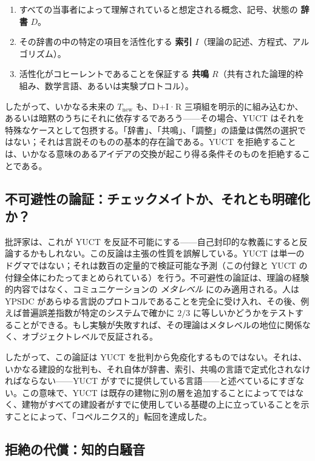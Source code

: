 \documentclass[12pt,a4paper]{article}
\begin{document}
	\begin{enumerate}
		\item すべての当事者によって理解されていると想定される概念、記号、状態の \textbf{辞書} \(D\)。
		\item その辞書の中の特定の項目を活性化する \textbf{索引} \(I\)（理論の記述、方程式、アルゴリズム）。
		\item 活性化がコヒーレントであることを保証する \textbf{共鳴} \(R\)（共有された論理的枠組み、数学言語、あるいは実験プロトコル）。
	\end{enumerate}
	
	したがって、いかなる未来の \(T_{\text{new}}\) も、D+I·R 三項組を明示的に組み込むか、あるいは暗黙のうちにそれに依存するであろう——その場合、YUCT はそれを特殊なケースとして包摂する。「辞書」、「共鳴」、「調整」の語彙は偶然の選択ではない；それは言説そのものの基本的存在論である。YUCT を拒絶することは、いかなる意味のあるアイデアの交換が起こり得る条件そのものを拒絶することである。
	
	\subsection{不可避性の論証：チェックメイトか、それとも明確化か？}
	
	批評家は、これが YUCT を反証不可能にする——自己封印的な教義にすると反論するかもしれない。この反論は主張の性質を誤解している。YUCT は単一のドグマではない；それは数百の定量的で検証可能な予測（この付録と YUCT の付録全体にわたってまとめられている）を行う。不可避性の論証は、理論の経験的内容ではなく、コミュニケーションの \emph{メタレベル} にのみ適用される。人は YPSDC があらゆる言説のプロトコルであることを完全に受け入れ、その後、例えば普遍誤差指数が特定のシステムで確かに \(2/3\) に等しいかどうかをテストすることができる。もし実験が失敗すれば、その理論はメタレベルの地位に関係なく、オブジェクトレベルで反証される。
	
	したがって、この論証は YUCT を批判から免疫化するものではない。それは、いかなる建設的な批判も、それ自体が辞書、索引、共鳴の言語で定式化されなければならない——YUCT がすでに提供している言語——と述べているにすぎない。この意味で、YUCT は既存の建物に別の層を追加することによってではなく、建物がすべての建設者がすでに使用している基礎の上に立っていることを示すことによって、「コペルニクス的」転回を達成した。
	
	\subsection{拒絶の代償：知的白騒音}
	
\end{document}
